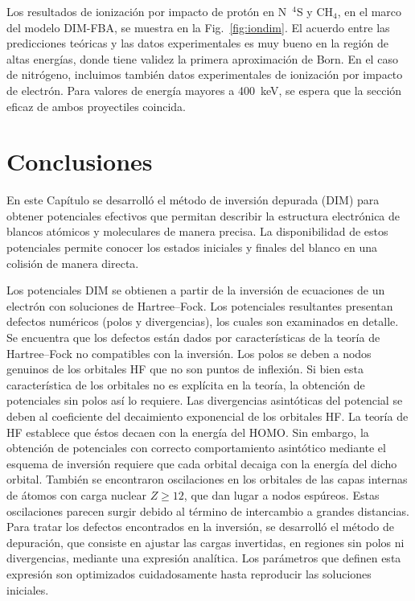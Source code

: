 {{{{Los resultados de ionización por impacto de protón en N~$^4$S y CH$_4$, 
en el marco del modelo DIM-FBA, se muestra en la Fig.~\ref{fig:iondim}. 
El acuerdo entre las predicciones teóricas y las datos experimentales es 
muy bueno en la región de altas energías, donde tiene validez la primera 
aproximación de Born. En el caso de nitrógeno, incluimos también datos 
experimentales de ionización por impacto de electrón. Para valores de 
energía mayores a 400~keV, se espera que la sección eficaz de ambos 
proyectiles coincida. 

\section{Conclusiones}
\label{conclusion}

En este Capítulo se desarrolló el método de inversión depurada (DIM) 
para obtener potenciales efectivos que permitan describir la estructura 
electrónica de blancos atómicos y moleculares de manera precisa. La 
disponibilidad de estos potenciales permite conocer los estados 
iniciales y finales del blanco en una colisión de manera directa. 

Los potenciales DIM se obtienen a partir de la inversión de ecuaciones 
de un electrón con soluciones de Hartree--Fock. Los potenciales 
resultantes presentan defectos numéricos (polos y divergencias), los 
cuales son examinados en detalle. Se encuentra que los defectos están 
dados por características de la teoría de Hartree--Fock no compatibles
con la inversión. Los polos se deben a nodos genuinos de los orbitales 
HF que no son puntos de inflexión. Si bien esta característica de los 
orbitales no es explícita en la teoría, la obtención de potenciales sin 
polos así lo requiere. Las divergencias asintóticas del potencial se 
deben al coeficiente del decaimiento exponencial de los orbitales HF. 
La teoría de HF establece que éstos decaen con la energía del HOMO. Sin 
embargo, la obtención de potenciales con correcto comportamiento 
asintótico mediante el esquema de inversión requiere que cada orbital 
decaiga con la energía del dicho orbital. También se encontraron 
oscilaciones en los orbitales de las capas internas de átomos con carga 
nuclear $Z\ge 12$, que dan lugar a nodos espúreos. Estas oscilaciones 
parecen surgir debido al término de intercambio a grandes distancias. 
Para tratar los defectos encontrados en la inversión, se desarrolló el 
método de depuración, que consiste en ajustar las cargas invertidas, en 
regiones sin polos ni divergencias, mediante una expresión analítica. 
Los parámetros que definen esta expresión son optimizados cuidadosamente 
hasta reproducir las soluciones iniciales.

}}}}
